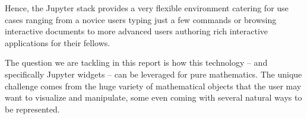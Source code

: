 \documentclass{deliverablereport}
\begin{document}

\newpage

Hence, the Jupyter stack provides a very flexible environment catering
for use cases ranging from a novice users typing just a few commands
or browsing interactive documents to more advanced users authoring
rich interactive applications for their fellows.

The question we are tackling in this report is how this technology --
and specifically Jupyter widgets -- can be leveraged for pure
mathematics. The unique challenge comes from the huge variety of
mathematical objects that the user may want to visualize and
manipulate, some even coming with several natural ways to be
represented.

\end{document}
